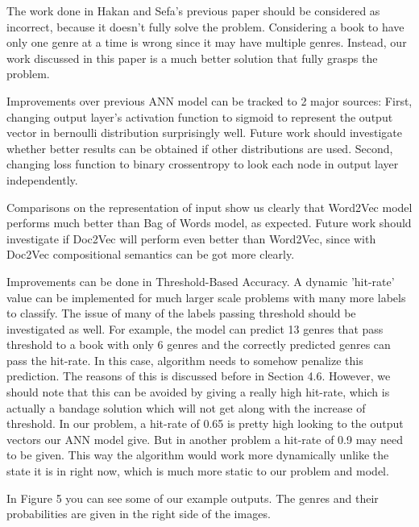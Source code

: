 \documentclass[10pt,twocolumn,letterpaper]{article}
\begin{document}
The work done in Hakan and Sefa's previous paper\cite{oldpaper} should be considered as incorrect, because it doesn't fully solve the problem. Considering a book to have only one genre at a time is wrong since it may have multiple genres. Instead, our work discussed in this paper is a much better 
solution that fully grasps the problem.

Improvements over previous ANN model can be tracked to 2 major sources: First, changing output layer's activation function to sigmoid to represent the output vector in bernoulli distribution surprisingly well. Future work should investigate whether better results can be obtained if other distributions are used. Second, changing loss function to binary crossentropy to look each node in output layer independently.

Comparisons on the representation of input show us clearly that Word2Vec model performs much better than Bag of Words model, as expected. Future work should investigate if Doc2Vec will perform even better than Word2Vec, since with Doc2Vec compositional semantics can be got more clearly.

Improvements can be done in Threshold-Based Accuracy. A dynamic 'hit-rate' value can be implemented for much larger scale problems with many more labels to classify. The issue of many of the labels passing threshold should be investigated as well. For example, the model can predict 13 genres that pass threshold to a book with only 6 genres and the correctly predicted genres can pass the hit-rate. In this case, algorithm needs to somehow penalize this prediction. The reasons of this is discussed before in Section 4.6. However, we should note that this can be avoided by giving a really high hit-rate, which is actually a bandage solution which will not get along with the increase of threshold. In our problem, a hit-rate of 0.65 is pretty high looking to the output vectors our ANN model give. But in another problem a hit-rate of 0.9 may need to be given. This way the algorithm would work more dynamically unlike the state it is in right now, which is much more static to our problem and model.

In Figure 5 you can see some of our example outputs. The genres and their probabilities are given in the right side of the images.

{\small


}
\end{document}
